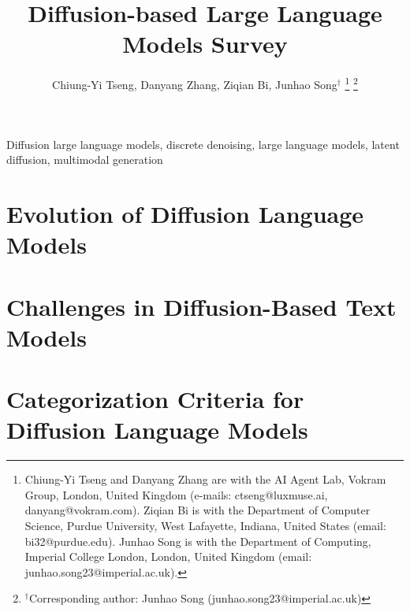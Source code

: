 \documentclass[lettersize,journal]{IEEEtran}
\begin{document}
\setlength{\abovedisplayskip}{6pt}
\setlength{\belowdisplayskip}{6pt}
\setlength{\abovedisplayshortskip}{4pt}
\setlength{\belowdisplayshortskip}{4pt}

\title{Diffusion-based Large Language Models Survey}

\author{Chiung-Yi Tseng, Danyang Zhang, Ziqian Bi, Junhao Song$^{\dagger}$%
\thanks{Chiung-Yi Tseng and Danyang Zhang are with the AI Agent Lab, Vokram Group, London, United Kingdom (e-mails: ctseng@luxmuse.ai, danyang@vokram.com). Ziqian Bi is with the Department of Computer Science, Purdue University, West Lafayette, Indiana, United States (email: bi32@purdue.edu). Junhao Song is with the Department of Computing, Imperial College London, London, United Kingdom (email: junhao.song23@imperial.ac.uk).}%
\thanks{$^{\dagger}$Corresponding author: Junhao Song (junhao.song23@imperial.ac.uk)}
}


\maketitle

\begin{abstract}

\end{abstract}

\begin{IEEEkeywords}
Diffusion large language models, discrete denoising, large language models, latent diffusion, multimodal generation
\end{IEEEkeywords}

\section{Evolution of Diffusion Language Models}
\label{sec:evolution}


\section{Challenges in Diffusion-Based Text Models}
\label{sec:challenges}



\section{Categorization Criteria for Diffusion Language Models}
\label{sec:categorization_methods}


\end{document}
